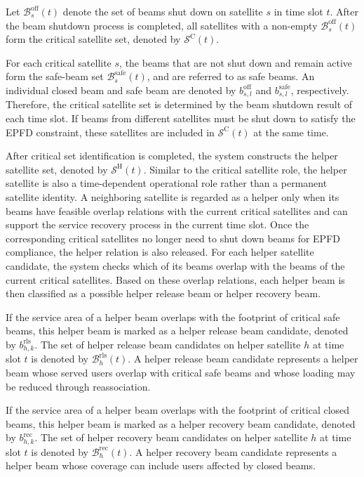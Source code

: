 Let $\mathcal{B}_{s}^{\mathrm{off}}(t)$ denote the set of beams shut down on satellite $s$ in time slot $t$. After the beam shutdown process is completed, all satellites with a non-empty $\mathcal{B}_{s}^{\mathrm{off}}(t)$ form the critical satellite set, denoted by $\mathcal{S}^{\mathrm{C}}(t)$.

For each critical satellite $s$, the beams that are not shut down and remain active form the safe-beam set $\mathcal{B}_{s}^{\mathrm{safe}}(t)$, and are referred to as safe beams. An individual closed beam and safe beam are denoted by $b_{s,l}^{\mathrm{off}}$ and $b_{s,l}^{\mathrm{safe}}$, respectively. Therefore, the critical satellite set is determined by the beam shutdown result of each time slot. If beams from different satellites must be shut down to satisfy the EPFD constraint, these satellites are included in $\mathcal{S}^{\mathrm{C}}(t)$ at the same time.

After critical set identification is completed, the system constructs the helper satellite set, denoted by $\mathcal{S}^{\mathrm{H}}(t)$. Similar to the critical satellite role, the helper satellite is also a time-dependent operational role rather than a permanent satellite identity. A neighboring satellite is regarded as a helper only when its beams have feasible overlap relations with the current critical satellites and can support the service recovery process in the current time slot. Once the corresponding critical satellites no longer need to shut down beams for EPFD compliance, the helper relation is also released. For each helper satellite candidate, the system checks which of its beams overlap with the beams of the current critical satellites. Based on these overlap relations, each helper beam is then classified as a possible helper release beam or helper recovery beam.

If the service area of a helper beam overlaps with the footprint of critical safe beams, this helper beam is marked as a helper release beam candidate, denoted by $b_{h,k}^{\mathrm{rls}}$. The set of helper release beam candidates on helper satellite $h$ at time slot $t$ is denoted by $\mathcal{B}_{h}^{\mathrm{rls}}(t)$. A helper release beam candidate represents a helper beam whose served users overlap with critical safe beams and whose loading may be reduced through reassociation.

If the service area of a helper beam overlaps with the footprint of critical closed beams, this helper beam is marked as a helper recovery beam candidate, denoted by $b_{h,k}^{\mathrm{rec}}$. The set of helper recovery beam candidates on helper satellite $h$ at time slot $t$ is denoted by $\mathcal{B}_{h}^{\mathrm{rec}}(t)$. A helper recovery beam candidate represents a helper beam whose coverage can include users affected by closed beams.

